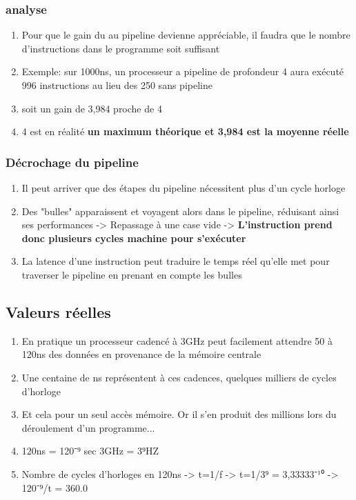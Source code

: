 \subsubsection{analyse}
\begin{enumerate}
\item Pour que le gain du au pipeline devienne appréciable, il faudra que le nombre d'instructions dans le programme soit suffisant
\item Exemple: sur 1000ns, un processeur a pipeline de profondeur 4 aura exécuté 996 instructions au lieu des 250 sans pipeline
\item soit un gain de 3,984 proche de 4
\item 4 est en réalité \textbf{un maximum théorique et 3,984 est la moyenne réelle}
\end{enumerate}

\subsubsection{Décrochage du pipeline}
\begin{enumerate}
\item Il peut arriver que des étapes du pipeline nécessitent plus d'un cycle horloge
\item Des "bulles" apparaissent et voyagent alors dans le pipeline, réduisant ainsi ses performances -> Repassage à une case vide -> \textbf{L'instruction prend donc plusieurs cycles machine pour s'exécuter}
\item La latence d'une instruction peut traduire le temps réel qu'elle met pour traverser le pipeline en prenant en compte les bulles
\end{enumerate}

\subsection{Valeurs réelles}
\begin{enumerate}
\item En pratique un processeur cadencé à 3GHz peut facilement attendre 50 à 120ns des données en provenance de la mémoire centrale
\item Une centaine de ns représentent à ces cadences, quelques milliers de cycles d'horloge 
\item Et cela pour un seul accès mémoire. Or il s'en produit des millions lors du déroulement d'un programme...
\item 120ns = 120⁻⁹ sec 3GHz = 3⁹HZ
\item Nombre de cycles d'horloges en 120ns -> t=1/f -> t=1/3⁹ = 3,33333⁻¹⁰ -> 120⁻⁹/t = 360.0
\end{enumerate}


